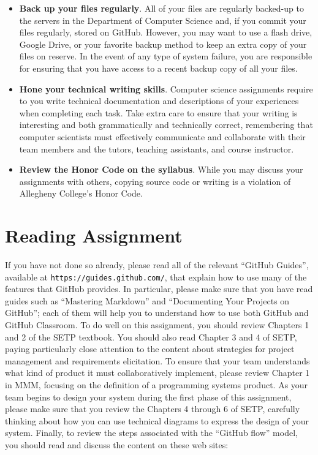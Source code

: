 \documentclass[11pt]{article}
\newcommand{\url}[1]{\lstinline{#1}}
\begin{document}
\begin{itemize}
\item {\bf Back up your files regularly}. All of your files are regularly backed-up to the servers in the Department of
  Computer Science and, if you commit your files regularly, stored on GitHub. However, you may want to use a flash
  drive, Google Drive, or your favorite backup method to keep an extra copy of your files on reserve. In the event of
  any type of system failure, you are responsible for ensuring that you have access to a recent backup copy of all your
  files.

\item {\bf Hone your technical writing skills}. Computer science assignments require to you write technical
  documentation and descriptions of your experiences when completing each task. Take extra care to ensure that your
  writing is interesting and both grammatically and technically correct, remembering that computer scientists must
  effectively communicate and collaborate with their team members and the tutors, teaching assistants, and course
  instructor.

\item {\bf Review the Honor Code on the syllabus}. While you may discuss your assignments with others, copying source
  code or writing is a violation of Allegheny College's Honor Code.

\end{itemize}

\vspace*{-1em}

\section*{Reading Assignment}

If you have not done so already, please read all of the relevant ``GitHub Guides'', available at
\url{https://guides.github.com/}, that explain how to use many of the features that GitHub provides. In particular,
please make sure that you have read guides such as ``Mastering Markdown'' and ``Documenting Your Projects on GitHub'';
each of them will help you to understand how to use both GitHub and GitHub Classroom. To do well on this assignment, you
should review Chapters 1 and 2 of the SETP textbook. You should also read Chapter 3 and 4 of SETP, paying particularly
close attention to the content about strategies for project management and requirements elicitation. To ensure that your
team understands what kind of product it must collaboratively implement, please review Chapter 1 in MMM, focusing on the
definition of a programming systems product. As your team begins to design your system during the first phase of this
assignment, please make sure that you review the Chapters 4 through 6 of SETP, carefully thinking about how you can use
technical diagrams to express the design of your system. Finally, to review the steps associated with the ``GitHub
flow'' model, you should read and discuss the content on these web sites:
\end{document}
